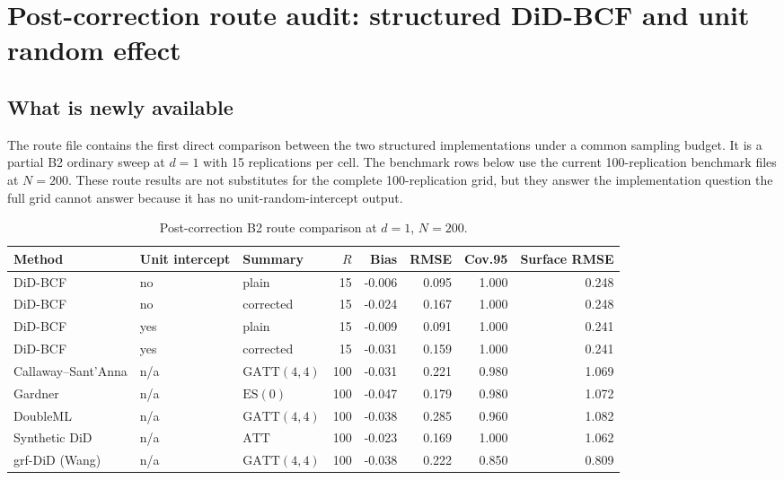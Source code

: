 \documentclass[11pt]{article}
\newcommand{\att}{\mathrm{ATT}}
\newcommand{\gatt}{\mathrm{GATT}}
\newcommand{\es}{\mathrm{ES}}
\begin{document}
\section{Post-correction route audit: structured DiD-BCF and unit random effect}

\subsection{What is newly available}

The route file contains the first direct comparison between the two structured
implementations under a common sampling budget. It is a partial B2 ordinary
sweep at $d=1$ with 15 replications per cell. The benchmark rows below use
the current 100-replication benchmark files at $N=200$. These route results
are not substitutes for the complete 100-replication grid, but they answer
the implementation question the full grid cannot answer because it has no
unit-random-intercept output.

\begin{table}[htbp]
\centering
\footnotesize
\caption{Post-correction B2 route comparison at $d=1$, $N=200$.}
\label{tab:route-head}
\begin{tabular}{lllrrrrr}
\toprule
Method & Unit intercept & Summary & $R$ & Bias & RMSE & Cov.95 & Surface RMSE \\
\midrule
DiD-BCF & no & plain & 15 & -0.006 & 0.095 & 1.000 & 0.248 \\
DiD-BCF & no & corrected & 15 & -0.024 & 0.167 & 1.000 & 0.248 \\
DiD-BCF & yes & plain & 15 & -0.009 & 0.091 & 1.000 & 0.241 \\
DiD-BCF & yes & corrected & 15 & -0.031 & 0.159 & 1.000 & 0.241 \\
Callaway--Sant'Anna & n/a & $\gatt(4,4)$ & 100 & -0.031 & 0.221 & 0.980 & 1.069 \\
Gardner & n/a & $\es(0)$ & 100 & -0.047 & 0.179 & 0.980 & 1.072 \\
DoubleML & n/a & $\gatt(4,4)$ & 100 & -0.038 & 0.285 & 0.960 & 1.082 \\
Synthetic DiD & n/a & $\att$ & 100 & -0.023 & 0.169 & 1.000 & 1.062 \\
grf-DiD (Wang) & n/a & $\gatt(4,4)$ & 100 & -0.038 & 0.222 & 0.850 & 0.809 \\
\bottomrule
\end{tabular}
\end{table}
\end{document}

